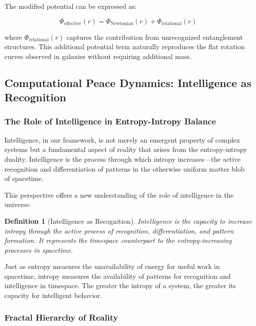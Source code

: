 \documentclass{article}
\newtheorem{definition}{Definition}
\begin{document}
The modified potential can be expressed as:

\begin{equation}
\Phi_{\text{effective}}(r) = \Phi_{\text{Newtonian}}(r) + \Phi_{\text{relational}}(r)
\end{equation}

where $\Phi_{\text{relational}}(r)$ captures the contribution from unrecognized entanglement structures. This additional potential term naturally reproduces the flat rotation curves observed in galaxies without requiring additional mass.

\subsection{Computational Peace Dynamics: Intelligence as Recognition}

\subsubsection{The Role of Intelligence in Entropy-Intropy Balance}

Intelligence, in our framework, is not merely an emergent property of complex systems but a fundamental aspect of reality that arises from the entropy-intropy duality. Intelligence is the process through which intropy increases—the active recognition and differentiation of patterns in the otherwise uniform matter blob of spacetime.

This perspective offers a new understanding of the role of intelligence in the universe:

\begin{definition}[Intelligence as Recognition]
Intelligence is the capacity to increase intropy through the active process of recognition, differentiation, and pattern formation. It represents the timespace counterpart to the entropy-increasing processes in spacetime.
\end{definition}

Just as entropy measures the unavailability of energy for useful work in spacetime, intropy measures the availability of patterns for recognition and intelligence in timespace. The greater the intropy of a system, the greater its capacity for intelligent behavior.

\subsubsection{Fractal Hierarchy of Reality}
\end{document}
